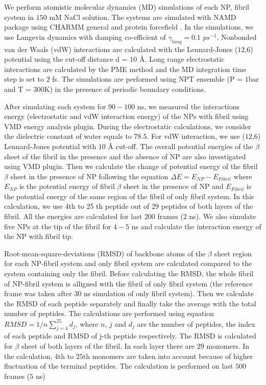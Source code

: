 \documentclass[journal=jacsat,manuscript=communication]{achemso}
\begin{document}
We perform atomistic molecular dynamics (MD) simulations of each NP, fibril
system in $150$ mM NaCl solution. The systems are simulated with NAMD package
\cite{Philip2005} using CHARMM general\cite{Mackerell2010,Yu2012} and protein
forcefield \cite{Mackerell1998,Mackerell2004}. In the simulations, we use
Langevin dynamics with damping co-efficient of $\gamma_{lang} = 0.1$ $ps^{-1}$.
Nonbonded van der Waals (vdW) interactions are calculated with the Lennard-Jones
($12$,$6$) potential using the cut-off distance d = $10$ {\AA}.  Long range
electrostatic interactions are calculated by the PME method \cite{PME} and the
MD integration time step is set to $2$ fs. The simulations are performed using
NPT ensemble (P = $1$bar and T = $300$K) in the presence of periodic boundary
conditions. 

After simulating each system for $90-100$ ns, we measured the interactions
energy (electrostatic and vdW interaction energy) of the NPs with fibril 
using VMD energy analysis plugin.  During the electrostatic
calculations, we consider the dielectric constant of water equals to $78.5$. For
vdW interaction, we use ($12$,$6$) Lennard-Jones potential with $10$ {\AA}
cut-off. The overall potential energies of the $\beta$ sheet of the fibril in
the presence and the absence of NP are also investigated using VMD plugin. Then
we calculate the change of potential energy of the fibril $\beta$ sheet in the
presence of NP following the equation ${\Delta}E = E_{NP} - E_{Fibril}$ 
where $E_{NP}$ is the potential energy of fibril $\beta$ sheet in the presence
of NP and $E_{Fibril}$ is the potential energy of the same region of the fibril
of only fibril system. In this calculation, we use 4th to 25 th peptide out of
29 peptides of both layers of the fibril. All the energies are calculated for
last $200$ frames ($2$ ns). We also simulate five NPs at the tip of the fibril
for $4-5$ ns and calculate the interaction energy of the NP with fibril tip.

Root-mean-square-deviations (RMSD) of backbone atoms of the $\beta$ sheet region
for each NP-fibril system and only fibril system are calculated compared to the
system containing only the fibril. Before calculating the RMSD, the whole fibril
of NP-fibril system is alligned with the fibril of only fibril system (the
reference frame was taken after $30$ ns simulation of only fibril system). Then
we calculate the RMSD of each peptide separately and finally take the average
with the total number of peptides. The calculations are performed using equation
$RMSD = 1/n \sum_{j=4}^{25} d_j$, where $n$, $j$ and $d_j$ are the number
of peptides, the index of each peptide and  RMSD of j-th peptide respectively.
The RMSD is calculated for $\beta$ sheet of both layers of the fibril. In each
layer there are $29$ monomers. In the calculation, $4$th to $25$th monomers are
taken into account because of higher fluctuation of the terminal peptides. The
calculation is performed on last $500$ frames ($5$ ns)
\end{document}
